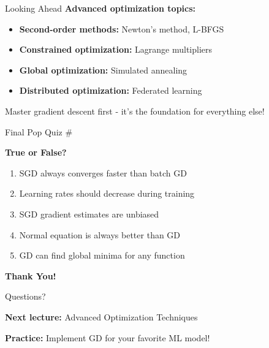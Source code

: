 \documentclass[usenames,dvipsnames]{beamer}
\begin{document}
  \begin{frame}{Looking Ahead}
    \textbf{Advanced optimization topics:}
    
    \begin{itemize}[<+->]
        \item \textbf{Second-order methods:} Newton's method, L-BFGS
        \item \textbf{Constrained optimization:} Lagrange multipliers
        \item \textbf{Global optimization:} Simulated annealing
        \item \textbf{Distributed optimization:} Federated learning
    \end{itemize}
    
    \pause
    \begin{keypointsbox}
    Master gradient descent first - it's the foundation for everything else!
    \end{keypointsbox}
  \end{frame}

  \begin{frame}{Final Pop Quiz \#\thepopquiz}
    \begin{popquizbox}{\thepopquiz}
    \textbf{True or False?}
    \begin{enumerate}
        \item SGD always converges faster than batch GD
        \item Learning rates should decrease during training
        \item SGD gradient estimates are unbiased
        \item Normal equation is always better than GD
        \item GD can find global minima for any function
    \end{enumerate}
    \end{popquizbox}
  \end{frame}

  \begin{frame}
    \centering
    \Huge \textbf{Thank You!}
    
    \vspace{1cm}
    \Large Questions?
    
    \vspace{1cm}
    \normalsize
    \textbf{Next lecture:} Advanced Optimization Techniques
    
    \textbf{Practice:} Implement GD for your favorite ML model!
  \end{frame}
\end{document}
